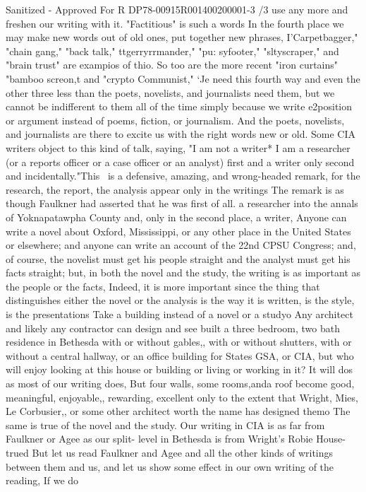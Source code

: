 \documentclass[
    oneside,
    11pt,
    draft
]{memoir}
\begin{document}
Sanitized - Approved For R DP78-00915R001400200001-3 /3 use any more and freshen our writing with it. "Factitious" is such a words In the fourth place we may make new words out of old ones, put together new phrases, I'Carpetbagger," "chain gang," "back talk," ttgerryrrmander," "pu: syfooter," "sltyscraper," and "brain trust" are exampios of thio. So too are the more recent "iron curtains" "bamboo screon,t and "crypto Communist," `Je need this fourth way and even the other three less than the poets, novelists, and journalists need them, but we cannot be indifferent to them all of the time simply because we write e2position or argument instead of poems, fiction, or journalism. And the poets, novelists, and journalists are there to excite us with the right words new or old. Some CIA writers object to this kind of talk, saying, "I am not a writer* I am a researcher (or a reports officer or a case officer or an analyst) first and a writer only second and incidentally."This~ is a defensive, amazing, and wrong-headed remark, for the research, the report, the analysis appear only in the writings The remark is as though Faulkner had asserted that he was first of all. a researcher into the annals of Yoknapatawpha County and, only in the second place, a writer, Anyone can write a novel about Oxford, Mississippi, or any other place in the United States or elsewhere; and anyone can write an account of the 22nd CPSU Congress; and, of course, the novelist must get his people straight and the analyst must get his facts straight; but, in both the novel and the study, the writing is as important as the people or the facts, Indeed, it is more important since the thing that distinguishes either the novel or the analysis is the way it is written, is the style, is the presentations Take a building instead of a novel or a studyo Any architect and likely any contractor can design and see built a three bedroom, two bath residence in Bethesda with or without gables,, with or without shutters, with or without a central hallway, or an office building for States GSA, or CIA, but who will enjoy looking at this house or building or living or working in it? It will dos as most of our writing does, But four walls, some rooms,anda roof become good, meaningful, enjoyable,, rewarding, excellent only to the extent that Wright, Mies, Le Corbusier,, or some other architect worth the name has designed themo The same is true of the novel and the study. Our writing in CIA is as far from Faulkner or Agee as our split- level in Bethesda is from Wright's Robie House-trued But let us read Faulkner and Agee and all the other kinds of writings between them and us, and let us show some effect in our own writing of the reading, If we do
\end{document}
